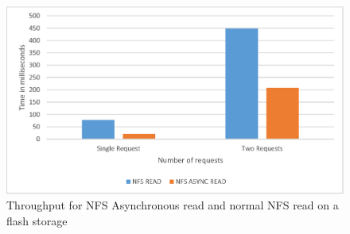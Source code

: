 \begin{figure}
\centering
\includegraphics[scale=1.0]{figures/Throughput.eps}
\caption{Throughput for NFS Asynchronous read and normal NFS read on a flash storage}
\label{fig:NFSThroughput}
\end{figure}




